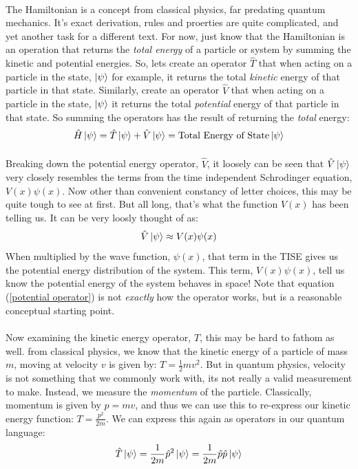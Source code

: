 \documentclass[12pt,letterpaper]{book}
\begin{document}
\paragraph*{}The Hamiltonian is a concept from classical physics, far predating quantum mechanics. It's exact derivation, rules and proerties are quite complicated, and yet another task for a different text. For now, just know that the Hamiltonian is an operation that returns the \textit{total energy} of a particle or system by summing the kinetic and potential energies. So, lets create an operator $\hat{T}$ that when acting on a particle in the state, $\ket{\psi}$ for example, it returns the total \textit{kinetic} energy of that particle in that state. Similarly, create an operator $\hat{V}$ that when acting on a particle in the state, $\ket{\psi}$ it returns the total \textit{potential} energy of that particle in that state. So summing the operators has the result of returning the \textit{total} energy:
\begin{equation}
\label{Hamiltonian}
\hat{H}\ket{\psi} = \hat{T}\ket{\psi} + \hat{V}\ket{\psi} = \text{Total Energy of State}\ket{\psi}
\end{equation}
\paragraph*{}Breaking down the potential energy operator, $\hat{V}$, it loosely can be seen that $\hat{V}\ket{\psi}$ very closely resembles the terms from the time independent Schrodinger equation, $V(x)\psi(x)$. Now other than convenient constancy of letter choices, this may be quite tough to see at first. But all long, that's what the function $V(x)$ has been telling us. It can be very loosly thought of as:
\begin{equation}
\label{potential operator}
\hat{V}\ket{\psi} \approx V(x)\psi(x)
\end{equation}
When multiplied by the wave function, $\psi(x)$, that term in the TISE gives us the potential energy distribution of the system. This term, $V(x)\psi(x)$, tell us know the potential energy of the system behaves in space! Note that equation (\ref{potential operator}) is not \textit{exactly} how the operator works, but is a reasonable conceptual starting point.
\paragraph*{}Now examining the kinetic energy operator, $\hat{T}$, this may be hard to fathom as well. from classical physics, we know that the kinetic energy of a particle of mass $m$, moving at velocity $v$ is given by: $T = \frac{1}{2}mv^2$. But in quantum physics, velocity is not something that we commonly work with, its not really a valid measurement to make. Instead, we measure the \textit{momentum} of the particle. Classically, momentum is given by $p = mv$, and thus we can use this to re-express our kinetic energy function: 
$T = \frac{p^2}{2m}$. We can express this again as operators in our quantum language:
\begin{equation}
\hat{T}\ket{\psi} = \frac{1}{2m}\hat{p}^2 \ket{\psi} = \frac{1}{2m}\hat{p}\hat{p}\ket{\psi}
\end{equation}
\end{document}
